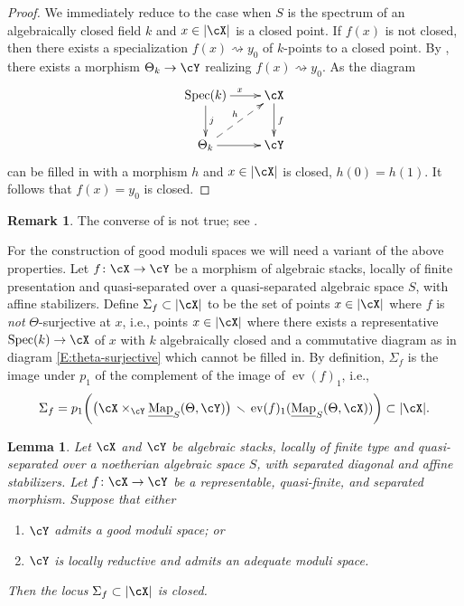 \documentclass[a4paper]{amsart}
\numberwithin{equation}{section}
\theoremstyle{plain}
\newtheorem{lem}[thm]{Lemma}
\theoremstyle{definition}
\newtheorem{rem}[thm]{Remark}
\DeclareMathOperator{\Spec}{Spec}
\DeclareMathOperator{\ev}{ev}
\newcommand{\uMap}{\underline{{\rm Map}}}
\newcommand{\co}{\colon}
\begin{document}
\begin{proof}
We immediately reduce to the case when $S$ is the spectrum of an algebraically closed field $k$ and $x \in |\cX|$ is a closed point.  If $f(x)$ is not closed, then there exists a specialization $f(x) \rightsquigarrow y_0$ of $k$-points to a closed point.  By , there exists a morphism $\Theta_k \to \cY$ realizing $f(x) \rightsquigarrow y_0$.  As the diagram
$$\xymatrix{
\Spec(k) \ar[d]^{j} \ar[r]	^{x}	& \cX   \ar[d]^f\\
 \Theta_k \ar[r]	\ar@{-->}[ur]^h		& \cY
}$$
can be filled in with a morphism $h$ and $x \in |\cX|$ is closed, $h(0) = h(1)$.  It follows that $f(x) = y_0$ is closed.
\end{proof}


\begin{rem}
The converse of   is not true; see .  
\end{rem}
For the construction of good moduli spaces we will need a variant of the above properties. 
Let $f \co \cX \to \cY$ be a morphism of algebraic stacks, locally of finite presentation and quasi-separated over a quasi-separated algebraic space $S$, with affine stabilizers.
Define $\Sigma_f \subset |\cX|$ to be the set of points $x \in |\cX|$ where $f$ is \emph{not} $\Theta$-surjective at $x$, i.e., points $x \in |\cX|$ where there exists a representative $\Spec(k) \to \cX$ of $x$ with $k$ algebraically closed and a commutative diagram as in diagram \eqref{E:theta-surjective} which cannot be filled in. 
By definition, $\Sigma_f$ is the image under $p_1$ of the complement of the image of $\ev(f)_1$, i.e.,
\begin{equation} \label{E:sigma-equality}
\Sigma_f = p_1\bigg( \big( \cX \times_{\cY}  \uMap_S(\Theta,\cY) \big) \, \smallsetminus \,  \ev(f)_1 (\uMap_S(\Theta,\cX) ) \bigg) \subset  |\cX|.
\end{equation}

\begin{lem} \label{L:sigma-closed}
Let $\cX$ and $\cY$ be algebraic stacks, locally of finite {type and quasi-separated over a noetherian} algebraic space $S$, with separated diagonal and affine stabilizers. Let $f \co \cX \to \cY$ be a representable, quasi-finite, and separated morphism.  Suppose that either
	\begin{enumerate}
		\item $\cY$ admits a good moduli space; or
		\item $\cY$ is locally reductive and admits an adequate moduli space.
	\end{enumerate}
	Then the locus $\Sigma_f \subset |\cX|$ is closed.
\end{lem}
\end{document}

